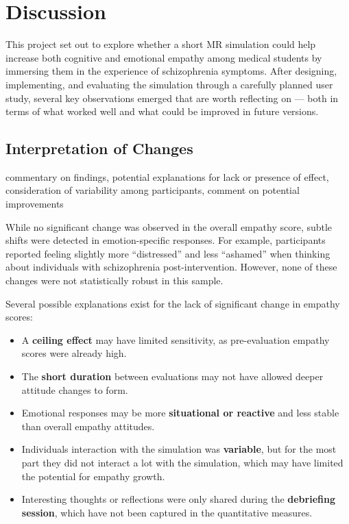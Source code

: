 \chapter{Discussion}
\label{ch:discussion}

This project set out to explore whether a short MR simulation could help increase both cognitive and emotional empathy among medical students by immersing them in the experience of schizophrenia symptoms. After designing, implementing, and evaluating the simulation through a carefully planned user study, several key observations emerged that are worth reflecting on — both in terms of what worked well and what could be improved in future versions.

\section{Interpretation of Changes}

commentary on findings, potential explanations for lack or presence of effect, consideration of variability among participants, comment on potential improvements


While no significant change was observed in the overall empathy score, subtle shifts were detected in emotion-specific responses. For example, participants reported feeling slightly more “distressed” and less “ashamed” when thinking about individuals with schizophrenia post-intervention. However, none of these changes were not statistically robust in this sample.

Several possible explanations exist for the lack of significant change in empathy scores:
\begin{itemize}
  \item A \textbf{ceiling effect} may have limited sensitivity, as pre-evaluation empathy scores were already high.
  \item The \textbf{short duration} between evaluations may not have allowed deeper attitude changes to form.
  \item Emotional responses may be more \textbf{situational or reactive} and less stable than overall empathy attitudes.
  \item Individuals interaction with the simulation was \textbf{variable}, but for the most part they did not interact a lot with the simulation, which may have limited the potential for empathy growth.
  \item Interesting thoughts or reflections were only shared during the \textbf{debriefing session}, which have not been captured in the quantitative measures.
\end{itemize}

